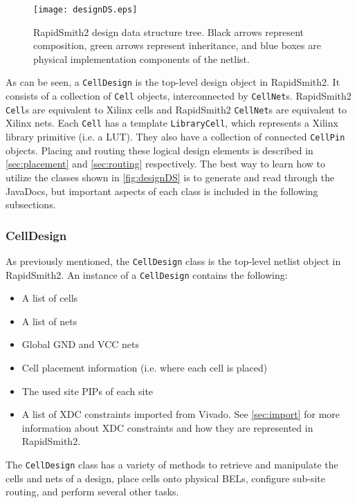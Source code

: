 \begin{figure}[H]
 \centering
 \texttt{[image: designDS.eps]}
 \caption{RapidSmith2 design data structure tree. Black arrows represent
 composition, green arrows represent inheritance, and blue boxes are physical
 implementation components of the netlist.}
 \label{fig:designDS}
\end{figure}

As can be seen, a \texttt{CellDesign} is the top-level design object in
RapidSmith2. It consists of a collection of \texttt{Cell} objects,
interconnected by \texttt{CellNet}s. RapidSmith2 \texttt{Cell}s are equivalent
to Xilinx cells and RapidSmith2 \texttt{CellNet}s are equivalent to Xilinx nets.
Each \texttt{Cell} has a template \texttt{LibraryCell}, which represents
a Xilinx library primitive (i.e. a LUT). They also have a collection of
connected \texttt{CellPin} objects. Placing and routing these logical design
elements is described in \autoref{sec:placement} and \ref{sec:routing}
respectively. The best way to learn how to utilize the classes shown in
\autoref{fig:designDS} is to generate and read through the
JavaDocs, but important aspects of each class is included in the
following subsections.


\subsubsection{CellDesign}
As previously mentioned, the \texttt{CellDesign} class is the top-level netlist
object in RapidSmith2. An instance of a \texttt{CellDesign} contains the
following:

\begin{itemize}
  \item A list of cells
  \item A list of nets 
  \item Global GND and VCC nets
  \item Cell placement information (i.e. where each cell is placed)
  \item The used site PIPs of each site
  \item A list of XDC constraints imported from Vivado. See \autoref{sec:import}
  for more information about XDC constraints and how they are represented in
  RapidSmith2.
\end{itemize}

\noindent
The \texttt{CellDesign} class has a variety of methods to retrieve and manipulate
the cells and nets of a design, place cells onto physical BELs, configure
sub-site routing, and perform several other tasks.
 
